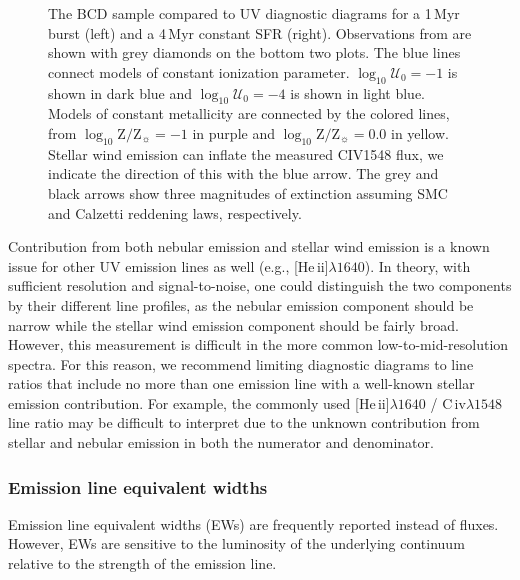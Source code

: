 \documentclass[preprint2]{aastex61}
\newcommand{\heii}{[He\,{\sc ii}]\xspace}
\newcommand{\civ}{C\,{\sc iv}\xspace}
\newcommand{\Myr}{$\,$Myr\xspace}
\newcommand{\logten}{\ensuremath{\log_{10}}}
\newcommand{\logZeq}[1]{\ensuremath{\logten \mathrm{Z}/\mathrm{Z}_{\sun} = #1}}
\newcommand{\logUeq}[1]{\ensuremath{\logten \mathcal{U}_0 = #1}}
\begin{document}
\begin{figure}
\begin{center}
    \caption{The \citet{Berg+2016} BCD sample compared to UV diagnostic diagrams for a 1\Myr burst (left) and a 4\Myr constant SFR (right). Observations from \citet{Senchyna+2017} are shown with grey diamonds on the bottom two plots. The blue lines connect models of constant ionization parameter. \logUeq{-1} is shown in dark blue and \logUeq{-4} is shown in light blue. Models of constant metallicity are connected by the colored lines, from \logZeq{-1} in purple and \logZeq{0.0} in yellow. Stellar wind emission can inflate the measured C\textsc{IV}1548 flux, we indicate the direction of this with the blue arrow. The grey and black arrows show three magnitudes of extinction assuming SMC and Calzetti reddening laws, respectively.}
    \label{fig:dataDD3}
  \end{center}
\end{figure}

Contribution from both nebular emission and stellar wind emission is a known issue for other UV emission lines as well (e.g., \heii$\lambda1640$). In theory, with sufficient resolution and signal-to-noise, one could distinguish the two components by their different line profiles, as the nebular emission component should be narrow while the stellar wind emission component should be fairly broad. However, this measurement is difficult in the more common low-to-mid-resolution spectra. For this reason,  we recommend limiting diagnostic diagrams to line ratios that include no more than one emission line with a well-known stellar emission contribution. For example, the commonly used \heii$\lambda1640$ / \civ$\lambda1548$ line ratio \citep[e.g., ][]{Feltre+2016, Nakajima+2017} may be difficult to interpret due to the unknown contribution from stellar and nebular emission in both the numerator and denominator.

\subsubsection{Emission line equivalent widths} \label{sec:obs:UV:EWs}

Emission line equivalent widths (EWs) are frequently reported instead of fluxes. However, EWs are sensitive to the luminosity of the underlying continuum relative to the strength of the emission line.
\end{document}
